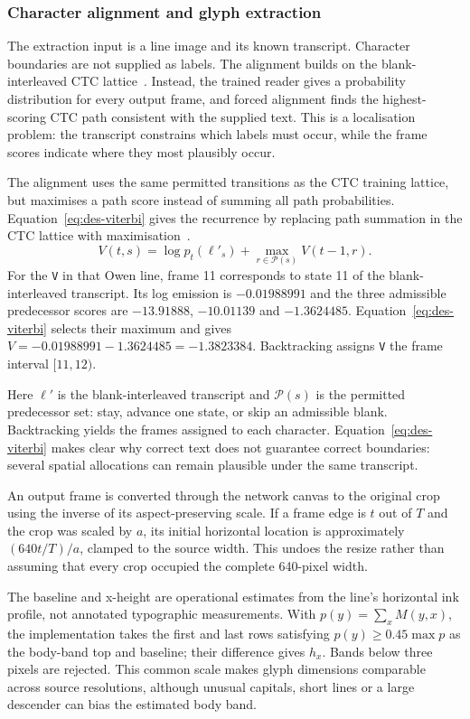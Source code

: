 \subsubsection{Character alignment and glyph extraction}
\label{sec:des-alignment}
The extraction input is a line image and its known transcript. Character boundaries are not supplied as labels. The alignment builds on the blank-interleaved CTC lattice~\cite[PDF pp.~4--5]{graves2006}. Instead, the trained reader gives a probability distribution for every output frame, and forced alignment finds the highest-scoring CTC path consistent with the supplied text. This is a localisation problem: the transcript constrains which labels must occur, while the frame scores indicate where they most plausibly occur.


The alignment uses the same permitted transitions as the CTC training lattice, but maximises a path score instead of summing all path probabilities. Equation~\ref{eq:des-viterbi} gives the recurrence by replacing path summation in the CTC lattice with maximisation~\cite[PDF pp.~4--5]{graves2006}.
\begin{equation}
V(t,s)=\log p_t(\ell'_s)+\max_{r\in\mathcal P(s)}V(t-1,r).
\label{eq:des-viterbi}
\end{equation}
For the \texttt{V} in that Owen line, frame 11 corresponds to state 11 of the blank-interleaved transcript. Its log emission is $-0.01988991$ and the three admissible predecessor scores are $-13.91888$, $-10.01139$ and $-1.3624485$. Equation~\ref{eq:des-viterbi} selects their maximum and gives $V=-0.01988991-1.3624485=-1.3823384$. Backtracking assigns \texttt{V} the frame interval $[11,12)$.

Here $\ell'$ is the blank-interleaved transcript and $\mathcal P(s)$ is the permitted predecessor set: stay, advance one state, or skip an admissible blank. Backtracking yields the frames assigned to each character. Equation~\ref{eq:des-viterbi} makes clear why correct text does not guarantee correct boundaries: several spatial allocations can remain plausible under the same transcript.

An output frame is converted through the network canvas to the original crop using the inverse of its aspect-preserving scale. If a frame edge is $t$ out of $T$ and the crop was scaled by $a$, its initial horizontal location is approximately $(640t/T)/a$, clamped to the source width. This undoes the resize rather than assuming that every crop occupied the complete 640-pixel width.

The baseline and x-height are operational estimates from the line's horizontal ink profile, not annotated typographic measurements. With $p(y)=\sum_x M(y,x)$, the implementation takes the first and last rows satisfying $p(y)\geq0.45\max p$ as the body-band top and baseline; their difference gives $h_x$. Bands below three pixels are rejected. This common scale makes glyph dimensions comparable across source resolutions, although unusual capitals, short lines or a large descender can bias the estimated body band.

